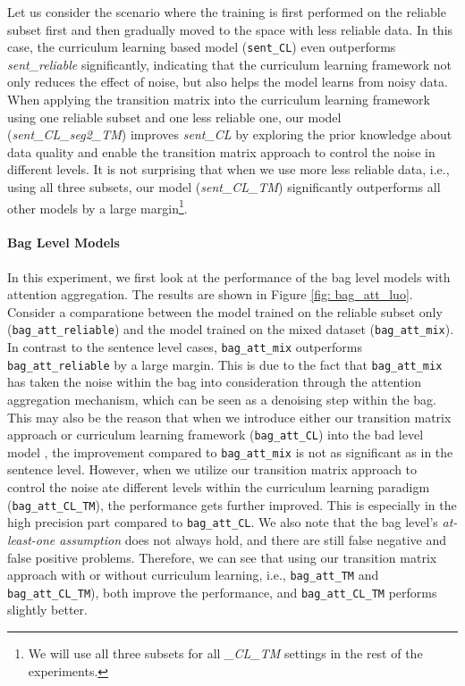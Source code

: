 Let us consider the scenario where the training is first performed on the
reliable subset first and then gradually moved to the space with less
reliable data. In this case, the curriculum learning based model
(\texttt{sent\_CL}) even  outperforms \emph{sent\_reliable} significantly,
indicating that the curriculum learning framework not only reduces the effect
of noise, but also helps the model learns from noisy data. When applying the
transition matrix into the curriculum learning framework using one reliable
subset and one less reliable one,   our model (\emph{sent\_CL\_seg2\_TM})
improves \emph{sent\_CL} by exploring the prior knowledge about data quality
and enable the transition matrix approach to control the noise in different
levels.  It is
not surprising that when we use more less reliable data, i.e., using all
three subsets, our model (\emph{sent\_CL\_TM}) significantly outperforms all
other models by a large margin\footnote{We will use all three subsets for all
\emph{\_CL\_TM} settings in the rest of the experiments.}. 


\paragraph{Bag Level Models}
In this experiment, we first look at the performance of the bag level models with attention aggregation. The results are shown in Figure \ref{fig: bag_att_luo}.
Consider a comparatione between the  model trained on the reliable subset only (\texttt{bag\_att\_reliable}) and  the model trained on the mixed dataset (\texttt{bag\_att\_mix}).
In contrast to the sentence level cases, \texttt{bag\_att\_mix} outperforms \texttt{bag\_att\_reliable} by a large margin. This is due to the fact that  \texttt{bag\_att\_mix} has taken the noise within the bag into consideration through the attention aggregation mechanism, which can be seen as a denoising step within the bag.
This may also be the reason that when we introduce either our transition matrix approach   or curriculum learning framework (\texttt{bag\_att\_CL})   into the bad level model , the improvement compared to \texttt{bag\_att\_mix}  is not as significant as in the sentence level.
However, when we utilize our transition matrix approach to control the noise ate different levels within the curriculum learning paradigm (\texttt{bag\_att\_CL\_TM}), the performance gets further improved. This is especially in the high precision part compared to \texttt{bag\_att\_CL}.
We also note that the bag level's  \textit{at-least-one assumption} does not always hold, and there are still false negative and false positive problems. Therefore, we can see that using our transition matrix approach with  or without curriculum learning, i.e.,  \texttt{bag\_att\_TM}  and \texttt{bag\_att\_CL\_TM}), both improve the performance, and \texttt{bag\_att\_CL\_TM} performs slightly better.


